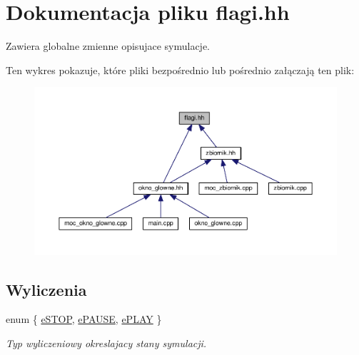 \hypertarget{flagi_8hh}{\section{Dokumentacja pliku flagi.\-hh}
\label{flagi_8hh}
}


Zawiera globalne zmienne opisujace symulacje.  


Ten wykres pokazuje, które pliki bezpośrednio lub pośrednio załączają ten plik\-:
\nopagebreak
\begin{figure}[H]
\begin{center}
\leavevmode
\includegraphics[width=350pt]{flagi_8hh__dep__incl}
\end{center}
\end{figure}
\subsection*{Wyliczenia}
\begin{DoxyCompactItemize}
\item 
enum \{ \hyperlink{flagi_8hh_a06fc87d81c62e9abb8790b6e5713c55ba4957581ee0386c284fd318121e335af6}{e\-S\-T\-O\-P}, 
\hyperlink{flagi_8hh_a06fc87d81c62e9abb8790b6e5713c55ba6a2f69efc37338427ecd0db296923a79}{e\-P\-A\-U\-S\-E}, 
\hyperlink{flagi_8hh_a06fc87d81c62e9abb8790b6e5713c55baecdbae639704e0b7e4b5478734e45b8d}{e\-P\-L\-A\-Y}
 \}
\begin{DoxyCompactList}\small\item\em Typ wyliczeniowy okreslajacy stany symulacji. \end{DoxyCompactList}\end{DoxyCompactItemize}
